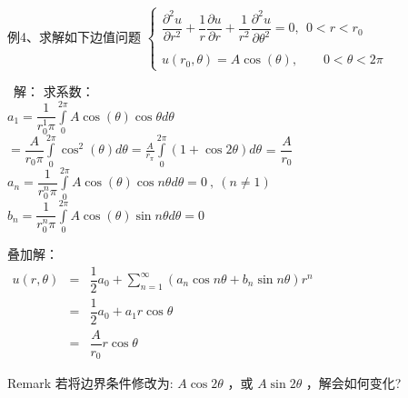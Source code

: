 \begin{frame}	
	\begin{exampleblock} { 例4、求解如下边值问题}
	{ $  \displaystyle  \left \{ 
	\begin{array}{cc}
		\displaystyle {	\dfrac{\partial^2 u }{\partial r^2 } +\dfrac{1}{r } \dfrac{\partial u }{\partial r } +
		\dfrac{1}{r^2 } \dfrac{\partial ^2 u }{\partial \theta ^2
		} } =0, ~~ 0<r<r_0\\
		\\
		u(r_0,\theta )=A\cos(\theta),~~~~~~~~~ 0<\theta <2\pi 
	\end{array}
	\right. $}  
	\end{exampleblock}	
	\alert{ 解：}	 求系数：\\
	$  \displaystyle  a_1 = \dfrac{1}{r_0 ^1 \pi }  \int\limits_{0}^{2\pi} A\cos(\theta) \cos  \theta d\theta  $ \\ 	
	\hspace{0.8cm}$  \displaystyle  = \dfrac{A}{r_0  \pi }  \int\limits_{0}^{2\pi} \cos ^2 (\theta)  d\theta  = \frac{A}{r_ \pi }  \int\limits_{0}^{2\pi} (1+\cos2\theta) d\theta$ = $\dfrac{A}{r_0}$ \\ 
	$  \displaystyle  a_n = \dfrac{1}{r_0 ^n \pi }  \int\limits_{0}^{2\pi} A\cos(\theta) \cos n \theta d\theta =0~,~ (n\ne 1)$ \\ 
	$  \displaystyle  b_n = \dfrac{1}{r_0 ^n \pi }  \int\limits_{0}^{2\pi} A\cos(\theta) \sin n \theta d\theta =0 $  \\ 
\end{frame}	

\begin{frame}	
	叠加解：\\
	$\begin{array}{llll}
		u(r, \theta) &=& \dfrac{1}{2} a_0 +\sum\limits_{n=1}^{\infty } (a_n\cos n\theta +b_n \sin n \theta ) r^n \\
		&=& \dfrac{1}{2} a_0+ a_1 r\cos \theta \\
		&=&  \dfrac{A}{r_0} r \cos \theta 
	\end{array}$ \\ 
	\begin{block}{Remark}
		若将边界条件修改为: $A \cos 2\theta$ ，或 $A \sin 2\theta $ ，解会如何变化?
	\end{block}
\end{frame}	

